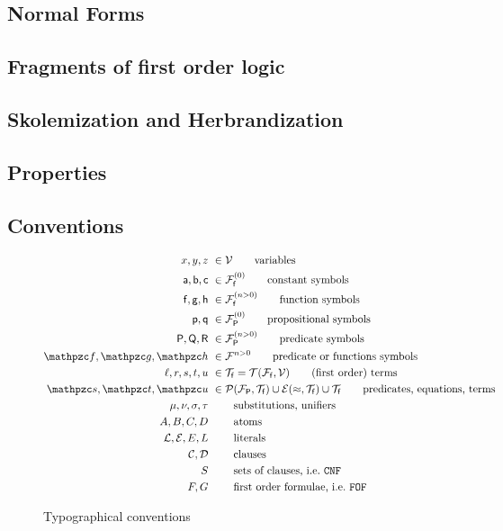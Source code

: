\subsection{Normal Forms}



\subsection{Fragments of first order logic}





\subsection{Skolemization and Herbrandization}



\subsection{Properties}



\subsection{Conventions}



\begin{figure}[hbt]
	\begin{align*}
	x,y,z &\ \in\mcV \tag*{variables} \\
	\ma,\mb,\mc &\ \in\mcFfn[{0}]\tag*{constant symbols} \\
	\mf, \mg, \mh &\ \in\mcFfn[{n>0}]\tag*{function symbols} \\
	\mpp, \mpq&\ \in\mcFPn[{0}]\tag*{propositional symbols}\\
	\mP, \mQ, \mR &\ \in\mcFPn[{n>0}]\tag*{predicate symbols}\\
	\mcf, \mcg, \mch &\ \in\mcF^{n>0} \tag*{predicate or functions symbols}\\
	\ell, r, s,t,u &\ \in\mcTf = \mcTFfV\tag*{(first order) terms}\\
	\mcs, \mct, \mcu &\ \in \mcPT \cup \mcET \cup \mcTf \tag*{predicates, equations, terms}\\
	\mu, \nu, \sigma, \tau &\ \tag*{substitutions, unifiers}\\
	A,B,C,D &\ \tag*{atoms} \\
	\mcL, \mcE, E, L &\ \tag*{literals} \\
	\mcC, \mcD &\ \tag*{clauses} \\
	S &\ \tag*{sets of clauses, i.e.~\CNF}\\
	F, G &\ \tag*{first order formulae, i.e.~\FOF}
	\end{align*}
	\caption{Typographical conventions}
	\label{fig:conventions}
\end{figure}












